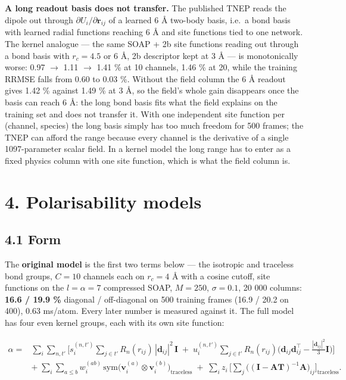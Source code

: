 \documentclass[11pt,a4paper]{article}
\begin{document}
\textbf{A long readout basis does not transfer.} The published TNEP reads the dipole out through
\(\partial U_i/\partial\mathbf r_{ij}\) of a learned 6 \AA{} two-body basis, i.e.~a bond basis with
learned radial functions reaching 6 \AA{} and site functions tied to one network. The kernel
analogue --- the same SOAP + 2b site functions reading out through a bond basis with \(r_c=4.5\) or
6 \AA{}, 2b descriptor kept at 3 \AA{} --- is monotonically worse: 0.97 \(\rightarrow\) 1.11
\(\rightarrow\) 1.41 \% at 10 channels, 1.46 \% at 20, while the training RRMSE falls from 0.60 to
0.03 \%. Without the field column the 6 \AA{} readout gives 1.42 \% against 1.49 \% at 3 \AA{}, so
the field's whole gain disappears once the basis can reach 6 \AA{}: the long bond basis fits what
the field explains on the training set and does not transfer it. With one independent site function
per (channel, species) the long basis simply has too much freedom for 500 frames; the TNEP can
afford the range because every channel is the derivative of a single 1097-parameter scalar field. In
a kernel model the long range has to enter as a fixed physics column with one site function, which
is what the field column is.

\section{4. Polarisability models}\label{polarisability-models}

\subsection{4.1 Form}\label{form}

The \textbf{original model} is the first two terms below --- the isotropic and traceless bond
groups, \(C=10\) channels each on \(r_c=4\) \AA{} with a cosine cutoff, site functions on the
\(l=\alpha=7\) compressed SOAP, \(M=250\), \(\sigma=0.1\), 20 000 columns: \textbf{16.6 / 19.9 \%}
diagonal / off-diagonal on 500 training frames (16.9 / 20.2 on 400), 0.63 ms/atom. Every later
number is measured against it. The full model has four even kernel groups, each with its own site
function:

\begin{align*}
\alpha ={}& \sum_i\sum_{n,t'}\Big[
 s^{(n,t')}_i \sum_{j\in t'} R_n(r_{ij})\,|\mathbf d_{ij}|^2\,\mathbf I
\;+\;
 u^{(n,t')}_i \sum_{j\in t'} R_n(r_{ij})\Big(\mathbf d_{ij}\mathbf d_{ij}^\top - \tfrac{|\mathbf d_{ij}|^2}{3}\mathbf I\Big)\Big] \\
&+\;\sum_i\sum_{a\le b} w^{(ab)}_i\,\mathrm{sym}\!\big(\mathbf v^{(a)}_i\otimes\mathbf v^{(b)}_i\big)_{\text{traceless}}
\;+\;
\sum_i z_i\,\Big[\sum_j \big((\mathbf I - \mathbf A\mathbf T)^{-1}\mathbf A\big)_{ij}\Big]_{\text{traceless}} .
\end{align*}
\end{document}
